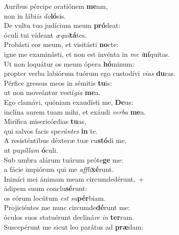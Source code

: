 \evenverse Auribus pércipe oratiónem \textbf{me}am,~\*\\
\evenverse non in lábi\textit{is} \textit{do}\textbf{ló}sis.\\
\oddverse De vultu tuo judícium meum \textbf{pró}deat:~\*\\
\oddverse óculi tui vídeant \textit{æ}\textit{qui}\textbf{tá}tes.\\
\evenverse Probásti cor meum, et visitásti \textbf{no}cte:~\*\\
\evenverse igne me examinásti, et non est invénta in \textit{me} \textit{i}\textbf{ní}quitas.\\
\oddverse Ut non loquátur os meum ópera \textbf{hó}minum:~\*\\
\oddverse propter verba labiórum tuórum ego custodívi \textit{vi}\textit{as} \textbf{du}ras.\\
\evenverse Pérfice gressus meos in sémitis \textbf{tu}is:~\*\\
\evenverse ut non moveántur vestí\textit{gi}\textit{a} \textbf{me}a.\\
\oddverse Ego clamávi, quóniam exaudísti me, \textbf{De}us:~\*\\
\oddverse inclína aurem tuam mihi, et exáudi \textit{ver}\textit{ba} \textbf{me}a.\\
\evenverse Mirífica misericórdias \textbf{tu}as,~\*\\
\evenverse qui salvos facis spe\textit{rán}\textit{tes} \textbf{in} te.\\
\oddverse A resisténtibus déxteræ tuæ cu\textbf{stó}di me,~\*\\
\oddverse ut pu\textit{píl}\textit{lam} \textbf{ó}culi.\\
\evenverse Sub umbra alárum tuárum próte\textbf{ge} me:~\*\\
\evenverse a fácie impiórum qui me \textit{af}\textit{fli}\textbf{xé}runt.\\
\oddverse Inimíci mei ánimam meam circumdedérunt,~+\\
\oddverse  ádipem suum conclu\textbf{sé}runt:~\*\\
\oddverse os eórum locútum \textit{est} \textit{su}\textbf{pér}biam.\\
\evenverse Projiciéntes me nunc circumde\textbf{dé}runt me:~\*\\
\evenverse óculos suos statuérunt decliná\textit{re} \textit{in} \textbf{ter}ram.\\
\oddverse Suscepérunt me sicut leo parátus ad \textbf{præ}dam:~\*\\
